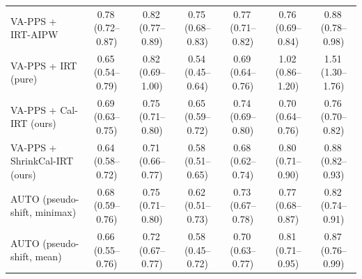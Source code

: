 \begin{tabular}{lcccccc}
VA-PPS + IRT-AIPW & 0.78\,\scriptsize(0.72--0.87) & 0.82\,\scriptsize(0.77--0.89) & 0.75\,\scriptsize(0.68--0.83) & 0.77\,\scriptsize(0.71--0.82) & 0.76\,\scriptsize(0.69--0.84) & 0.88\,\scriptsize(0.78--0.98) \\
VA-PPS + IRT (pure) & 0.65\,\scriptsize(0.54--0.79) & 0.82\,\scriptsize(0.69--1.00) & 0.54\,\scriptsize(0.45--0.64) & 0.69\,\scriptsize(0.64--0.76) & 1.02\,\scriptsize(0.86--1.20) & 1.51\,\scriptsize(1.30--1.76) \\
VA-PPS + Cal-IRT (ours) & 0.69\,\scriptsize(0.63--0.75) & 0.75\,\scriptsize(0.71--0.80) & 0.65\,\scriptsize(0.59--0.72) & 0.74\,\scriptsize(0.69--0.80) & 0.70\,\scriptsize(0.64--0.76) & 0.76\,\scriptsize(0.70--0.82) \\
VA-PPS + ShrinkCal-IRT (ours) & 0.64\,\scriptsize(0.58--0.72) & 0.71\,\scriptsize(0.66--0.77) & 0.58\,\scriptsize(0.51--0.65) & 0.68\,\scriptsize(0.62--0.74) & 0.80\,\scriptsize(0.71--0.90) & 0.88\,\scriptsize(0.82--0.93) \\
AUTO (pseudo-shift, minimax) & 0.68\,\scriptsize(0.59--0.76) & 0.75\,\scriptsize(0.71--0.80) & 0.62\,\scriptsize(0.51--0.73) & 0.73\,\scriptsize(0.67--0.78) & 0.77\,\scriptsize(0.68--0.87) & 0.82\,\scriptsize(0.74--0.91) \\
AUTO (pseudo-shift, mean) & 0.66\,\scriptsize(0.55--0.76) & 0.72\,\scriptsize(0.67--0.77) & 0.58\,\scriptsize(0.45--0.72) & 0.70\,\scriptsize(0.63--0.77) & 0.81\,\scriptsize(0.71--0.95) & 0.87\,\scriptsize(0.76--0.99) \\
\bottomrule
\end{tabular}
